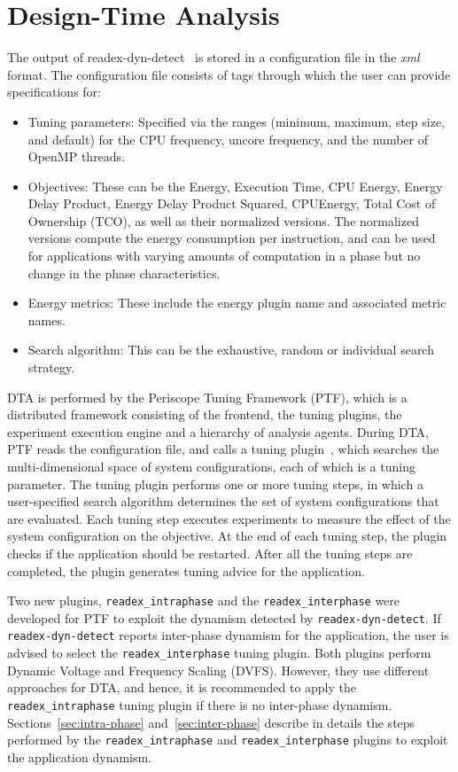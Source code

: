 \section{Design-Time Analysis} \label{sec:dta}
The output of readex-dyn-detect~\cite{kumaraswamy2018design} is stored in a configuration file in the \textit{xml} format. The configuration file consists of tags through which the user can provide specifications for:
\begin{itemize}
	\item Tuning parameters: Specified via the ranges (minimum, maximum, step size, and default) for the CPU frequency, uncore frequency, and the number of OpenMP threads.
	\item Objectives: These can be the Energy, Execution Time, CPU Energy, Energy Delay Product, Energy Delay Product Squared, CPUEnergy, Total Cost of Ownership (TCO), as well as their normalized versions. The normalized versions compute the energy consumption per instruction, and can be used for applications with varying amounts of computation in a phase but no change in the phase characteristics.
	\item Energy metrics: These include the energy plugin name and associated metric names. 
	\item Search algorithm: This can be the exhaustive, random or individual search strategy.
\end{itemize} 

DTA is performed by the Periscope Tuning Framework (PTF), which is a distributed framework consisting of the frontend, the tuning plugins, the experiment execution engine and a hierarchy of analysis agents. During DTA, PTF reads the configuration file, and calls a tuning plugin~\cite{AutoTune:Book2015}, which searches the multi-dimensional space of system configurations, each of which is a tuning parameter. The tuning plugin performs one or more tuning steps, in which a user-specified search algorithm determines the set of system configurations that are evaluated. Each tuning step executes experiments to measure the effect of the system configuration on the objective. At the end of each tuning step, the plugin checks if the application should be restarted. After all the tuning steps are completed, the plugin generates tuning advice for the application.

Two new plugins, \texttt{readex\_intraphase} and the \texttt{readex\_interphase} were developed for PTF to exploit the dynamism detected by \texttt{readex-dyn-detect}. If \texttt{readex-dyn-detect} reports inter-phase dynamism for the application, the user is advised to select the \texttt{readex\_interphase} tuning plugin. Both plugins perform Dynamic Voltage and Frequency Scaling (DVFS). However, they use different approaches for DTA, and hence, it is recommended to apply the \texttt{readex\_intraphase} tuning plugin if there is no inter-phase dynamism. Sections~\ref{sec:intra-phase} and~\ref{sec:inter-phase} describe in details the steps performed by the \texttt{readex\_intraphase} and \texttt{readex\_interphase} plugins to exploit the application dynamism.


